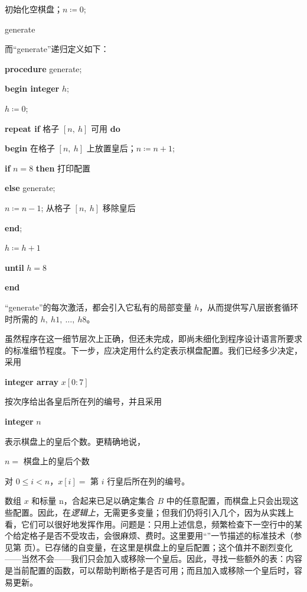 \documentclass[twoside,11pt,fontset=none]{ctexbook}
\begin{document}
\quad 初始化空棋盘；$n \coloneq 0$;

\quad generate

\noindent
而“generate”递归定义如下：

\textbf{procedure} generate;

\textbf{begin integer} $h$;

$h \coloneq 0$;

\textbf{repeat if} 格子 $[n,\ h]$ 可用 \textbf{do}

\quad \textbf{\textbf{begin}} 在格子 $[n,\ h]$ 上放置皇后；$n \coloneq n + 1$;

\quad \quad \textbf{if} $n = 8$ \textbf{then} 打印配置

\quad \quad \textbf{else} generate;

\quad \quad $n \coloneq n - 1$; 从格子 $[n,\ h]$ 移除皇后

\quad \textbf{end};

\quad $h \coloneq h + 1$

\quad \textbf{until} $h = 8$

\textbf{end}

“generate”的每次激活，都会引入它私有的局部变量 $h$，从而提供写八层嵌套循环时所需的 $h,\ h1,\ \dots,\ h8$。

虽然程序在这一细节层次上正确，但还未完成，即尚未细化到程序设计语言所要求的标准细节程度。下一步，应决定用什么约定表示棋盘配置。我们已经多少决定，采用

\quad \textbf{integer array} $x[0:7]$

\noindent
按次序给出各皇后所在列的编号，并且采用

\quad \textbf{integer} $n$

\noindent
表示棋盘上的皇后个数。更精确地说，

$n =$ 棋盘上的皇后个数

\parindent 对 $0 \leqslant i < n$，$x[i] =$ 第 $i$ 行皇后所在列的编号。

数组 $x$ 和标量 n，合起来已足以确定集合 $B$ 中的任意配置，而棋盘上只会出现这些配置。因此，在\textit{逻辑上}，无需更多变量；但我们仍将引入几个，因为从实践上看，它们可以很好地发挥作用。问题是：只用上述信息，频繁检查下一空行中的某个给定格子是否不受攻击，会很麻烦、费时。这里要用“”一节描述的标准技术（参见第 \pageref{sec:trading-storage-for-computation-speed} 页）。已存储的自变量，在这里是棋盘上的皇后配置；这个值并不剧烈变化——当然不会——我们只会加入或移除一个皇后。因此，寻找一些额外的表：内容是当前配置的函数，可以帮助判断格子是否可用；而且加入或移除一个皇后时，容易更新。
\end{document}
